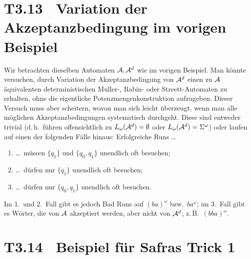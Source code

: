 \documentclass[fontsize=11pt, twoside=false, numbers=autoenddot]{scrbook}
\begin{document}
\goodbreak
\section*{T3.13~ Variation der Akzeptanzbedingung im vorigen Beispiel}

Wir betrachten dieselben Automaten $\mathcal{A},\mathcal{A}^d$ wie im vorigen Beispiel.
Man könnte versuchen, durch Variation der Akzeptanzbedingung von $\mathcal{A}^d$
einen zu $\mathcal{A}$ äquivalenten deterministischen Muller-, Rabin- oder Streett-Automaten
zu erhalten, ohne die eigentliche Potenzmengenkonstruktion aufzugeben.
Dieser Versuch muss aber scheitern, wovon man sich leicht überzeugt,
wenn man alle möglichen Akzeptanzbedingungen systematisch durchgeht.
Diese sind entweder trivial (d.\,h.\ führen offensichtlich zu $L_\omega(\mathcal{A}^d) = \emptyset$
oder $L_\omega(\mathcal{A}^d) = \Sigma^\omega$)
oder laufen auf einen der folgenden Fälle hinaus:
Erfolgreiche Runs \dots
%
\begin{enumerate}
  \item
    \dots\ müssen $\{q_1\}$ und $\{q_0,q_1\}$ unendlich oft besuchen;
  \item
    \dots\ dürfen nur $\{q_1\}$ unendlich oft besuchen;
  \item
    \dots\ dürfen nur $\{q_0,q_1\}$ unendlich oft besuchen.
\end{enumerate}
%
Im 1.\ und 2.\ Fall gibt es jedoch Bad Runs auf $(ba)^\omega$ bzw.\ $ba^\omega$;
im 3.\ Fall gibt es Wörter, die von $\mathcal{A}$ akzeptiert werden,
aber nicht von $\mathcal{A}^d$, z.\,B.\ $(bba)^\omega$.

\section*{T3.14~ Beispiel für Safras Trick 1}
\end{document}

